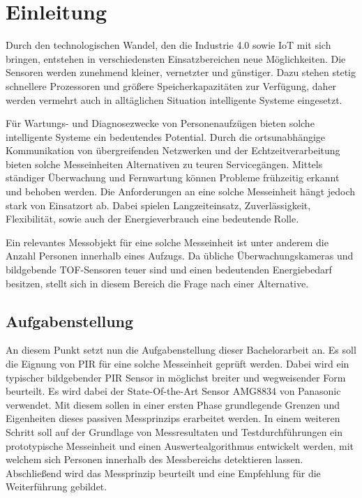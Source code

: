 \chapter{Einleitung}
\label{chap:Einleitung}


\label{sec:Ausgangssituation}
Durch den technologischen Wandel, den die Industrie 4.0 sowie \ac{IoT}  mit sich bringen, entstehen in verschiedensten Einsatzbereichen neue Möglichkeiten. Die Sensoren werden zunehmend kleiner, vernetzter und günstiger. Dazu stehen stetig schnellere Prozessoren und größere Speicherkapazitäten zur Verfügung, daher werden vermehrt auch in alltäglichen Situation intelligente Systeme eingesetzt. 

Für Wartungs- und Diagnosezwecke von Personenaufzügen bieten solche intelligente Systeme ein bedeutendes Potential. Durch die ortsunabhängige Kommunikation von übergreifenden Netzwerken und der Echtzeitverarbeitung bieten solche Messeinheiten Alternativen zu teuren Servicegängen. Mittels ständiger Überwachung und Fernwartung können Probleme frühzeitig erkannt und behoben werden. Die Anforderungen an eine solche Messeinheit hängt jedoch stark von Einsatzort ab. Dabei spielen Langzeiteinsatz, Zuverlässigkeit, Flexibilität, sowie auch der Energieverbrauch eine bedeutende Rolle.

Ein relevantes Messobjekt für eine solche Messeinheit ist unter anderem die Anzahl Personen innerhalb eines Aufzugs. Da übliche Überwachungskameras und bildgebende TOF-Sensoren teuer sind und einen bedeutenden Energiebedarf besitzen, stellt sich in diesem Bereich die Frage nach einer Alternative.

\section{Aufgabenstellung}
\label{chap:Aufgabenstellung}
An diesem Punkt setzt nun die Aufgabenstellung dieser Bachelorarbeit an. Es soll die Eignung von \ac{PIR} für eine solche Messeinheit geprüft werden. Dabei wird ein typischer bildgebender \ac{PIR} Sensor in möglichst breiter und wegweisender Form beurteilt. Es wird dabei der State-Of-the-Art Sensor AMG8834 von Panasonic verwendet. Mit diesem sollen in einer ersten Phase grundlegende Grenzen und Eigenheiten dieses passiven Messprinzips erarbeitet werden. In einem weiteren Schritt soll auf der Grundlage von Messresultaten und Testdurchführungen ein prototypische Messeinheit und einen Auswertealgorithmus entwickelt werden, mit welchem sich Personen innerhalb des Messbereichs detektieren lassen. Abschließend wird das Messprinzip beurteilt und eine Empfehlung für die Weiterführung gebildet. 

